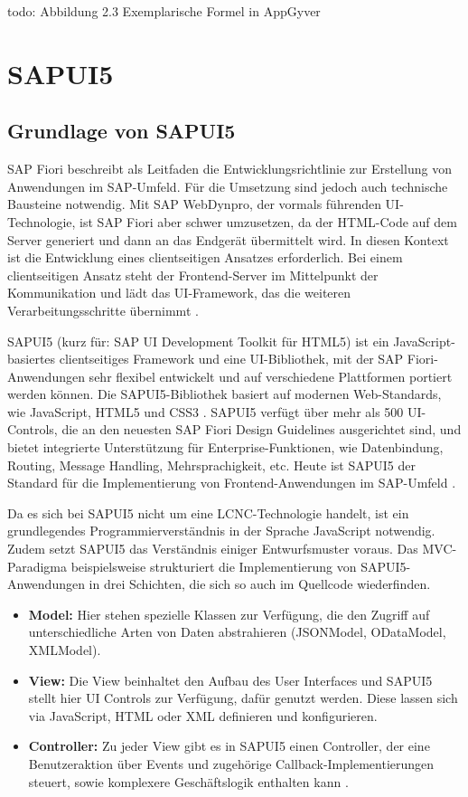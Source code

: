 todo: Abbildung 2.3 Exemplarische Formel in AppGyver 

\section{SAPUI5}
\subsection{Grundlage von SAPUI5}
SAP Fiori beschreibt als Leitfaden die Entwicklungsrichtlinie zur Erstellung von Anwendungen im SAP-Umfeld. Für die Umsetzung sind jedoch auch technische Bausteine notwendig. Mit SAP WebDynpro, der vormals führenden UI-Technologie, ist SAP Fiori aber schwer umzusetzen, da der HTML-Code auf dem Server generiert und dann an das Endgerät übermittelt wird. In diesen Kontext ist die Entwicklung eines clientseitigen Ansatzes erforderlich. Bei einem clientseitigen Ansatz steht der Frontend-Server im Mittelpunkt der Kommunikation und lädt das UI-Framework, das die weiteren Verarbeitungsschritte übernimmt \cite[S.45-47]{fiori}.

SAPUI5 (kurz für: SAP UI Development Toolkit für HTML5) ist ein JavaScript-basiertes clientseitiges Framework und eine UI-Bibliothek, mit der SAP Fiori-Anwendungen sehr flexibel entwickelt und auf verschiedene Plattformen portiert werden können. Die SAPUI5-Bibliothek basiert auf modernen Web-Standards, wie JavaScript, HTML5 und CSS3 \cite[S.139]{sapui5}. SAPUI5 verfügt über mehr als 500 UI-Controls, die an den neuesten SAP Fiori Design Guidelines ausgerichtet sind, und bietet integrierte Unterstützung für Enterprise-Funktionen, wie Datenbindung, Routing, Message Handling, Mehrsprachigkeit, etc. Heute ist SAPUI5 der Standard für die Implementierung von Frontend-Anwendungen im SAP-Umfeld \cite{sap:ui5}.

Da es sich bei SAPUI5 nicht um eine LCNC-Technologie handelt, ist ein grundlegendes Programmierverständnis in der Sprache JavaScript notwendig. Zudem setzt SAPUI5 das Verständnis einiger Entwurfsmuster voraus. Das MVC-Paradigma beispielsweise strukturiert die Implementierung von SAPUI5-Anwendungen in drei Schichten, die sich so auch im Quellcode wiederfinden.

\begin{itemize}[noitemsep]
\item \textbf{Model:} Hier stehen spezielle Klassen zur Verfügung, die den Zugriff auf unterschiedliche Arten von Daten abstrahieren (JSONModel, ODataModel, XMLModel).
\item \textbf{View:} Die View beinhaltet den Aufbau des User Interfaces und SAPUI5 stellt hier UI Controls zur Verfügung, dafür genutzt werden. Diese lassen sich via JavaScript, HTML oder XML definieren und konfigurieren.
\item \textbf{Controller:} Zu jeder View gibt es in SAPUI5 einen Controller, der eine Benutzeraktion über Events und zugehörige Callback-Implementierungen steuert, sowie komplexere Geschäftslogik enthalten kann \cite[S.149]{sapui5}.
\end{itemize}

